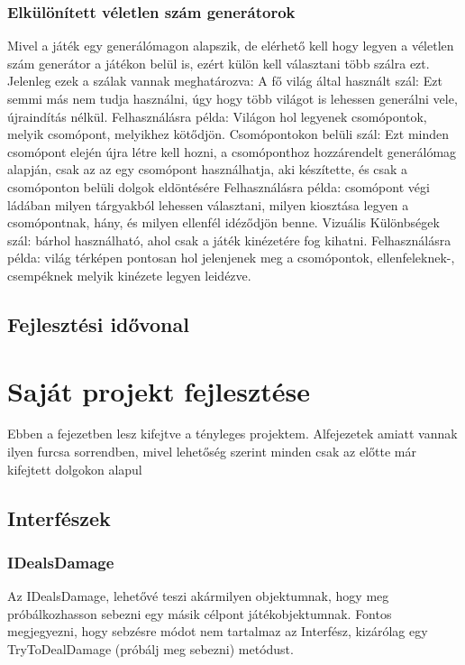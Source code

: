 \documentclass[
]{thesis-ekf}
\theoremstyle{definition}
\theoremstyle{remark}
\begin{document}
	\subsection{Elkülönített véletlen szám generátorok}
	Mivel a játék egy generálómagon alapszik, de elérhető kell hogy legyen a véletlen szám generátor a játékon belül is, ezért külön kell választani több szálra ezt.
	Jelenleg ezek a szálak vannak meghatározva:
	A fő világ által használt szál: Ezt semmi más nem tudja használni, úgy hogy több világot is lehessen generálni vele, újraindítás nélkül. Felhasználásra példa: Világon hol legyenek csomópontok, melyik csomópont, melyikhez kötődjön.
	Csomópontokon belüli szál: Ezt minden csomópont elején újra létre kell hozni, a csomóponthoz hozzárendelt generálómag alapján, csak az az egy csomópont használhatja, aki készítette, és csak a csomóponton belüli dolgok eldöntésére Felhasználásra példa: csomópont végi ládában milyen tárgyakból lehessen választani, milyen kiosztása legyen a csomópontnak, hány, és milyen ellenfél idéződjön benne.
	Vizuális Különbségek szál: bárhol használható, ahol csak a játék kinézetére fog kihatni. Felhasználásra példa: világ térképen pontosan hol jelenjenek meg a csomópontok, ellenfeleknek-, csempéknek melyik kinézete legyen leidézve.
	
	\section{Fejlesztési idővonal}
	
	
	\chapter{Saját projekt fejlesztése}
	Ebben a fejezetben lesz kifejtve a tényleges projektem. Alfejezetek amiatt vannak ilyen furcsa sorrendben, mivel lehetőség szerint minden csak az előtte már kifejtett dolgokon alapul
	\section{Interfészek}
	\subsection{IDealsDamage}
	Az IDealsDamage, lehetővé teszi akármilyen objektumnak, hogy meg próbálkozhasson sebezni egy másik célpont játékobjektumnak. Fontos megjegyezni, hogy sebzésre módot nem tartalmaz az Interfész, kizárólag egy TryToDealDamage (próbálj meg sebezni) metódust.
	
\end{document}
